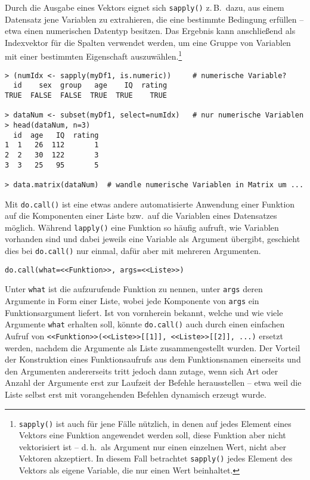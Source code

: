 Durch die Ausgabe eines Vektors eignet sich \lstinline!sapply()! z.\,B.\ dazu, aus einem Datensatz jene Variablen zu extrahieren, die eine bestimmte Bedingung erfüllen -- etwa einen numerischen Datentyp besitzen. Das Ergebnis kann anschließend als Indexvektor für die Spalten verwendet werden, um eine Gruppe von Variablen mit einer bestimmten Eigenschaft auszuwählen.\footnote{\lstinline!sapply()! ist auch für jene Fälle nützlich, in denen auf jedes Element eines Vektors eine Funktion angewendet werden soll, diese Funktion aber nicht vektorisiert ist -- d.\,h.\ als Argument nur einen einzelnen Wert, nicht aber Vektoren akzeptiert. In diesem Fall betrachtet \lstinline!sapply()! jedes Element des Vektors als eigene Variable, die nur einen Wert beinhaltet.}
\begin{lstlisting}
> (numIdx <- sapply(myDf1, is.numeric))     # numerische Variable?
  id    sex  group   age    IQ  rating
TRUE  FALSE  FALSE  TRUE  TRUE    TRUE

> dataNum <- subset(myDf1, select=numIdx)   # nur numerische Variablen
> head(dataNum, n=3)
  id  age   IQ  rating
1  1   26  112       1
2  2   30  122       3
3  3   25   95       5

> data.matrix(dataNum)  # wandle numerische Variablen in Matrix um ...
\end{lstlisting}

Mit \lstinline!do.call()! ist eine etwas andere automatisierte Anwendung einer Funktion auf die Komponenten einer Liste bzw.\ auf die Variablen eines Datensatzes möglich. Während \lstinline!lapply()! eine Funktion so häufig aufruft, wie Variablen vorhanden sind und dabei jeweils eine Variable als Argument übergibt, geschieht dies bei \lstinline!do.call()! nur einmal, dafür aber mit mehreren Argumenten.
\begin{lstlisting}
do.call(what=<<Funktion>>, args=<<Liste>>)
\end{lstlisting}

Unter \lstinline!what! ist die aufzurufende Funktion zu nennen, unter \lstinline!args! deren Argumente in Form einer Liste, wobei jede Komponente von \lstinline!args! ein Funktionsargument liefert. Ist von vornherein bekannt, welche und wie viele Argumente \lstinline!what! erhalten soll, könnte \lstinline!do.call()! auch durch einen einfachen Aufruf von \lstinline!<<Funktion>>(<<Liste>>[[1]], <<Liste>>[[2]], ...)! ersetzt werden, nachdem die Argumente als Liste zusammengestellt wurden. Der Vorteil der Konstruktion eines Funktionsaufrufs aus dem Funktionsnamen einerseits und den Argumenten andererseits tritt jedoch dann zutage, wenn sich Art oder Anzahl der Argumente erst zur Laufzeit der Befehle herausstellen -- etwa weil die Liste selbst erst mit vorangehenden Befehlen dynamisch erzeugt wurde.

